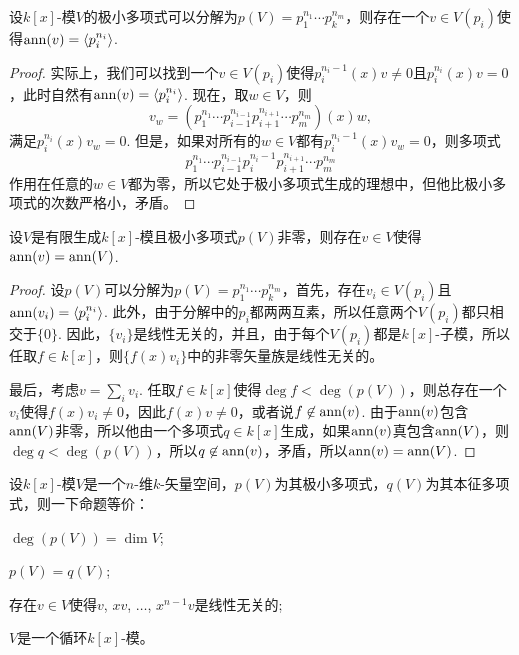 \begin{lem}\label{lem:6.3.9}
    设$k[x]$-模$V$的极小多项式可以分解为$p(V)=p_1^{n_1}\cdots p_k^{n_m}$，则存在一个$v\in V(p_i)$使得$\operatorname{ann}(v)=\langle p_i^{n_i}\rangle$.
\end{lem}

\begin{proof}
    实际上，我们可以找到一个$v\in V(p_i)$使得$p_i^{n_i-1}(x)v\neq 0$且$p_i^{n_i}(x)v=0$，此时自然有$\operatorname{ann}(v)=\langle p_i^{n_i}\rangle$. 现在，取$w\in V$，则
    \[
        v_w=\left(p_1^{n_1}\cdots p_{i-1}^{n_{i-1}}p_{i+1}^{n_{i+1}}\cdots p_{m}^{n_{m}}\right)(x)w,
    \]
    满足$p_i^{n_i}(x)v_w=0$. 但是，如果对所有的$w\in V$都有$p_i^{n_i-1}(x)v_w=0$，则多项式
    \[
        p_1^{n_1}\cdots p_{i-1}^{n_{i-1}}p_i^{n_i-1}p_{i+1}^{n_{i+1}}\cdots p_{m}^{n_{m}}
    \]
    作用在任意的$w\in V$都为零，所以它处于极小多项式生成的理想中，但他比极小多项式的次数严格小，矛盾。
\end{proof}

\begin{pro}\label{pro:6.3.6}
    设$V$是有限生成$k[x]$-模且极小多项式$p(V)$非零，则存在$v\in V$使得$\operatorname{ann}(v)=\operatorname{ann}(V)$.
\end{pro}

\begin{proof}
    设$p(V)$可以分解为$p(V)=p_1^{n_1}\cdots p_k^{n_m}$，首先，存在$v_i\in V(p_i)$且$\operatorname{ann}(v_i)=\langle p_i^{n_i}\rangle$. 此外，由于分解中的$p_i$都两两互素，所以任意两个$V(p_i)$都只相交于$\{0\}$. 因此，$\{v_i\}$是线性无关的，并且，由于每个$V(p_i)$都是$k[x]$-子模，所以任取$f\in k[x]$，则$\{f(x)v_i\}$中的非零矢量族是线性无关的。

    最后，考虑$v=\sum_i v_i$. 任取$f\in k[x]$使得$\deg f<\deg (p(V))$，则总存在一个$v_i$使得$f(x)v_i\neq 0$，因此$f(x)v\neq 0$，或者说$f\not\in \operatorname{ann}(v)$. 由于$\operatorname{ann}(v)$包含$\operatorname{ann}(V)$非零，所以他由一个多项式$q\in k[x]$生成，如果$\operatorname{ann}(v)$真包含$\operatorname{ann}(V)$，则$\deg q< \deg (p(V))$，所以$q\not\in \operatorname{ann}(v)$，矛盾，所以$\operatorname{ann}(v)=\operatorname{ann}(V)$.
\end{proof}

\begin{pro}\label{pro:6.3.7}
    设$k[x]$-模$V$是一个$n$-维$k$-矢量空间，$p(V)$为其极小多项式，$q(V)$为其本征多项式，则一下命题等价：
    \begin{compactenum}
        \item $\deg(p(V))=\dim V$;
        \item $p(V)=q(V)$;
        \item 存在$v\in V$使得$v$, $xv$, $\dots$, $x^{n-1}v$是线性无关的;
        \item $V$是一个循环$k[x]$-模。
    \end{compactenum}
\end{pro}

